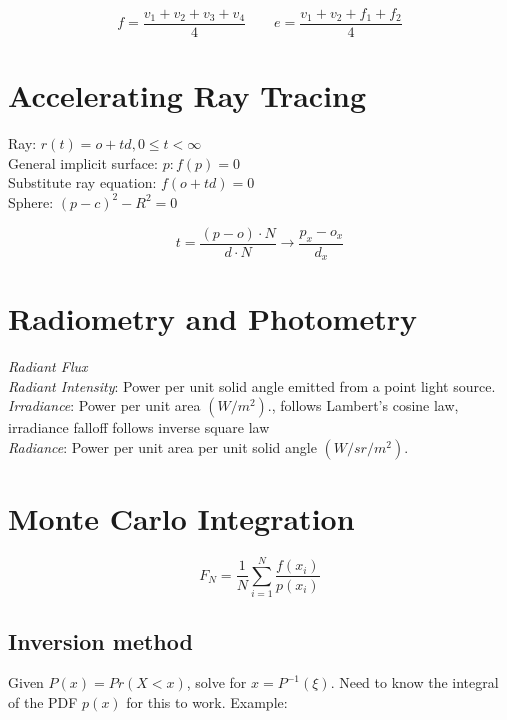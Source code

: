 \documentclass[10pt,landscape]{article}
\begin{document}
\begin{multicols}{3}
$$f = \frac{v_1 + v_2 + v_3 + v_4}{4} \qquad e = \frac{v_1 + v_2 + f_1 + f_2}{4}$$


\section{Accelerating Ray Tracing}

Ray: $r(t) = o + td, 0 \le t < \infty$ \\
General implicit surface: $p: f(p) = 0$ \\
Substitute ray equation: $f(o + td) = 0$ \\
Sphere: $(p - c)^2 - R^2 = 0$

$$t = \frac{(p - o) \cdot N}{d \cdot N} \rightarrow \frac{p_x - o_x}{d_x}$$


\section{Radiometry and Photometry}

\textit{Radiant Flux} \\
\textit{Radiant Intensity}: Power per unit solid angle emitted from a point light source. \\
\textit{Irradiance}: Power per unit area $(W/m^2)$., follows Lambert's cosine law, irradiance falloff follows inverse square law \\
\textit{Radiance}: Power per unit area per unit solid angle $(W/sr/m^2)$.


\section{Monte Carlo Integration}

$$F_N = \frac{1}{N} \sum_{i=1}^N \frac{f(x_i)}{p(x_i)}$$

\subsection{Inversion method}

Given $P(x) = Pr(X < x)$, solve for $x = P^{-1}(\xi)$. Need to know the integral of the PDF $p(x)$ for this to work. Example:


\end{multicols}
\end{document}
